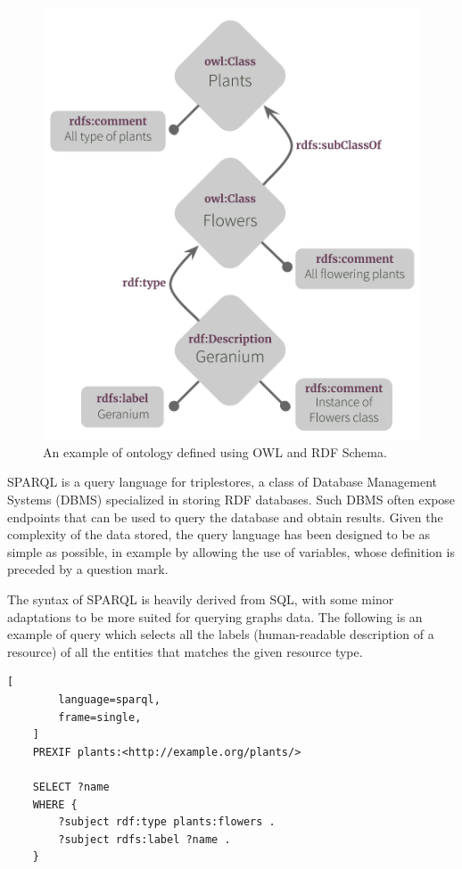 \documentclass[%
    corpo=13.5pt,
    twoside,
    oldstyle,
    tipotesi=magistrale,
    greek,
    evenboxes
]{toptesi}
\begin{document}
\begin{figure}[ht]
\centering
\includegraphics[scale=0.6]{img/owl-ontology-example.png}
\caption{An example of ontology defined using OWL and RDF Schema.}
\label{fig:owl-ontology-example}
\end{figure}

SPARQL is a query language for triplestores, a class of Database
Management Systems (DBMS) specialized in storing RDF databases. Such DBMS
often expose endpoints that can be used to query the database and obtain
results. Given the complexity of the data stored, the query language has
been designed to be as simple as possible, in example by allowing the use
of variables, whose definition is preceded by a question mark.

The syntax of SPARQL is heavily derived from SQL, with some
minor adaptations to be more suited for querying graphs data. The
following is an example of query which selects all the labels
(human-readable description of a resource) of all the entities that
matches the given resource type.

\begin{lstlisting}[
        language=sparql,
        frame=single,
    ]
    PREXIF plants:<http://example.org/plants/>

    SELECT ?name
    WHERE {
        ?subject rdf:type plants:flowers .
        ?subject rdfs:label ?name .
    }
\end{lstlisting}
\end{document}
